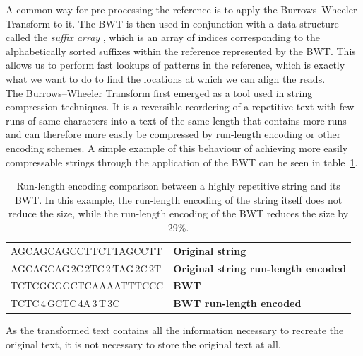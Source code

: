 \documentclass[a4paper,12pt,twoside,BCOR=10mm]{scrbook}
\begin{document}
A common way for pre-processing the reference is to apply the Burrows--Wheeler Transform \citep{Burrows1994} to it.
The BWT is then used in conjunction with a data structure
called the \textit{suffix array} \citep{Puglisi2007}, which
is an array of indices corresponding to the alphabetically sorted suffixes
within the reference represented by the BWT.
This allows us to
perform fast lookups of patterns in the reference, which is exactly what we want
to do to find the locations at which we can align the reads. \\
The Burrows--Wheeler Transform
first emerged as a tool used in string compression techniques.
It is a reversible reordering of a
repetitive text with few runs of same characters into a text of the same length that contains more runs
and can therefore more easily be compressed by run-length encoding or other encoding schemes.
A simple example of this behaviour of achieving more easily compressable strings through the application of the BWT
can be seen in table~\ref{table:evo_background_bwt_run_enc}.
\begin{table}[htb]
\centering
\caption[Run-length encoding comparison between a repetitive string and its BWT]{Run-length encoding comparison between a highly repetitive string and its BWT. In this example, the run-length encoding of the string itself does not reduce the size, while the run-length encoding of the BWT reduces the size by 29\%.}
   \begin{tabularx}{\textwidth}{ | X | X | }
   \hline
   AGCAGCAGCCTTCTTAGCCTT & \textbf{Original string} \\
   AGCAGCAG\,2C\,2TC\,2\,TAG\,2C\,2T & \textbf{Original string run-length encoded} \\
   \hline
   TCTCGGGGCTCAAAATTTCCC & \textbf{BWT} \\
   TCTC\,4\,GCTC\,4A\,3\,T\,3C & \textbf{BWT run-length encoded} \\
   \hline
   \end{tabularx}
\label{table:evo_background_bwt_run_enc}
\end{table}
As the transformed text contains all the information necessary to recreate the
original text, it is not necessary to store the original text at all.
\end{document}
